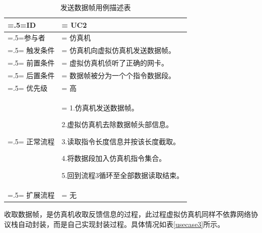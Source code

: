 \begin{table}[htbp]
    \begin{center}
        \caption{发送数据帧用例描述表}
        \label{usecase2}
        \renewcommand\arraystretch{1.5}
        \begin{tabularx}{0.8\textwidth}{ 
            | >{\centering\arraybackslash\hsize=.5\hsize\linewidth=\hsize}X 
            | >{\raggedright\arraybackslash\hsize=1.5\hsize\linewidth=\hsize}X 
            | }
            \hline
            \textbf{ID} & \textbf{UC2}\\
            \hline
            参与者 & 仿真机\\
            \hline
            触发条件 & 仿真机向虚拟仿真机发送数据帧。\\
            \hline
            前置条件 & 虚拟仿真机侦听了正确的网卡。\\
            \hline
            后置条件 & 数据帧被分为一个个指令数据段。\\
            \hline
            优先级 & 高\\
            \hline
            正常流程 & 1.仿真机发送数据帧。 \par 2.虚拟仿真机去除数据帧头部信息。\par 3.读取指令长度信息并按该长度截取。\par 4.将数据段加入仿真机指令集合。\par 5.回到流程3循环至全部数据读取结束。\\
            \hline
            扩展流程 & 无\\
            \hline
        \end{tabularx}
    \end{center}
\end{table}
\par
收取数据帧，是仿真机收取反馈信息的过程，此过程虚拟仿真机同样不依靠网络协议栈自动封装，而是自己实现封装过程。具体情况如表\ref{usecase3}所示。

